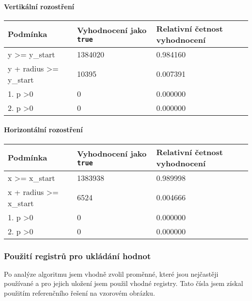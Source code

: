 \documentclass[12pt,a4paper,titlepage,final]{article}
\begin{document}
			\paragraph{Vertikální rozostření}
			\begin{center}
			    \begin{tabular}{ | l | l | l | }
			    \hline
			    Podmínka & Vyhodnocení jako \texttt{true} & Relativní četnost vyhodnocení \\ \hline
			    y \textgreater= y\_start & 1384020 & 0.984160 \\ \hline
			    y + radius \textgreater= y\_start & 10395 & 0.007391 \\ \hline
			    1. p \textgreater 0 & 0 & 0.000000 \\ \hline
			    2. p \textgreater 0 & 0 & 0.000000 \\ \hline
			    \end{tabular}
			\end{center}

			\paragraph{Horizontální rozostření}
			\begin{center}
			    \begin{tabular}{ | l | l | l | }
			    \hline
			    Podmínka & Vyhodnocení jako \texttt{true} & Relativní četnost vyhodnocení \\ \hline
			    x \textgreater= x\_start & 1383938 & 0.989998 \\ \hline
			    x + radius \textgreater= x\_start & 6524 & 0.004666 \\ \hline
			    1. p \textgreater  0 & 0 & 0.000000 \\ \hline
			    2. p \textgreater  0 & 0 & 0.000000 \\ \hline
			    \end{tabular}
			\end{center}


		\subsubsection{Použití registrů pro ukládání hodnot}
			Po analýze algoritmu jsem vhodně zvolil proměnné, které jsou nejčastěji používané
			a pro jejich uložení jsem použil vhodné registry. Tato čísla jsem získal použitím referenčního
			řešení na vzorovém obrázku.
\end{document}
